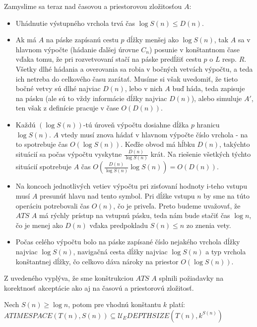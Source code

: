 {\begin{dokaz}
Zamyslime sa teraz nad časovou a priestorovou zložitosťou $A$:
\begin{itemize}
  \item Uhádnutie výstupného vrchola trvá čas $\log S(n)\leq D(n)$.
  \item Ak má $A$ na páske zapísanú cestu $p$ dĺžky menšej ako $\log
  S(n)$, tak $A$ sa v hlavnom výpočte (hádanie ďalšej úrovne
  $C_n$) posunie v konštantnom čase vďaka tomu, že pri
  rozvetvovaní stačí na páske predĺžiť cestu $p$ o $L$ resp. $R$.
  Všetky dlhé hádania a overovania sa robia v bočných vetvách
  výpočtu, a teda ich netreba do celkového času zarátať. Musíme si
  však uvedomiť, že tieto bočné vetvy sú dlhé najviac $D(n)$, lebo
  v nich $A$ buď háda, teda zapisuje na pásku (ale sú to vždy informácie
  dĺžky najviac $D(n)$), alebo simuluje $A'$, ten však z definície
  pracuje v čase $O(D(n))$.
  \item Každú $(\log S(n))$-tú úroveň výpočtu dosiahne dĺžka $p$
  hranicu $\log S(n)$. $A$ vtedy musí znova hádať v hlavnom
  výpočte číslo vrchola - na to spotrebuje čas $O(\log S(n))$.
  Keďže obvod má hĺbku $D(n)$, takýchto situácií sa počas výpočtu
  vyskytne $\frac{D(n)}{\log S(n)}$ krát. Na riešenie všetkých týchto
  situácií spotrebuje $A$ čas $O(\frac{D(n)}{\log S(n)} \log S(n))=O(D(n))$.
  \item Na koncoch jednotlivých vetiev výpočtu pri zisťovaní
  hodnoty i-teho vstupu musí $A$ presunúť hlavu nad tento symbol.
  Pri dĺžke vstupu $n$ by sme na túto operáciu potrebovali čas $O(n)$,
  čo je priveľa. Preto budeme uvažovať, že $ATS$ $A$ má rýchly
  prístup na vstupnú pásku, teda nám bude stačiť čas $\log n$, čo
  je menej ako $D(n)$ vďaka predpokladu $S(n)\leq n$ zo znenia
  vety.
  \item Počas celého výpočtu bolo na páske zapísané číslo nejakého
  vrchola dĺžky najviac $\log S(n)$, navigačná cesta dĺžky najviac
  $\log S(n)$ a typ vrchola konštantnej dĺžky, čo celkovo dáva
  nároky na priestor $O(\log S(n))$.
\end{itemize}
Z uvedeného vyplýva, že sme konštrukciou $ATS$ $A$ splnili
požiadavky na korektnosť akceptácie ako aj na časovú a priestorovú
zložitosť.
\end{dokaz}

\begin{veta}
Nech $S(n)\geq\log n$, potom pre vhodnú konštantu $k$ platí:\newline
$ATIMESPACE(T(n),S(n))\subseteq\mathcal{U}_E
DEPTHSIZE(T(n),k^{S(n)})$
\end{veta}

}
